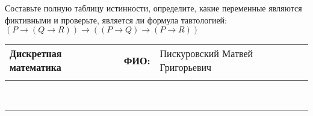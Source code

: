 \documentclass[10pt]{exam}
\newcommand{\class}{Дискретная математика}
\newcommand{\examdate}{}
\begin{document}
\begin{questions}
\begin{enumerate}[a)]
\end{enumerate}\question Составьте полную таблицу истинности, определите, какие переменные являются фиктивными и проверьте, является ли формула тавтологией:
$(P \rightarrow (Q \rightarrow R)) \rightarrow ((P \rightarrow Q) \rightarrow (P \rightarrow R))$

\end{questions}
\newpage
\begin{flushright}
\begin{tabular}{p{2.8in} r l}
\textbf{\class} & \textbf{ФИО:} &Пискуровский Матвей Григорьевич
\\

\textbf{\examdate} &&\\
\end{tabular}\\
\end{flushright}
\rule[1ex]{\textwidth}{.1pt}
\end{document}
